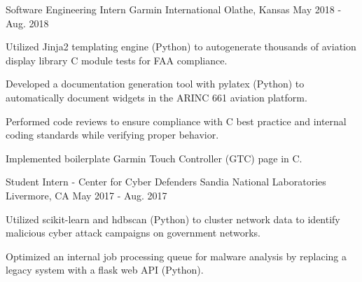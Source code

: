 

\begin{cventries}


\cventry
  {Software Engineering Intern} %
  {Garmin International} %
  {Olathe, Kansas} %
  {May 2018 - Aug. 2018} %
  {
    \begin{cvitems} %
      \item {Utilized Jinja2 templating engine (Python) to autogenerate thousands of aviation display library C module tests for FAA compliance.}
      \item {Developed a documentation generation tool with pylatex (Python) to automatically document widgets in the ARINC 661 aviation platform.}
      \item {Performed code reviews to ensure compliance with C best practice and internal coding standards while verifying proper behavior.}
      \item {Implemented boilerplate Garmin Touch Controller (GTC) page in C.}
    \end{cvitems}
  }


\cventry
  {Student Intern - Center for Cyber Defenders} %
  {Sandia National Laboratories} %
  {Livermore, CA} %
  {May 2017 - Aug. 2017} %
  {
    \begin{cvitems} %
      \item {Utilized scikit-learn and hdbscan (Python) to cluster network data to identify malicious cyber attack campaigns on government networks.}
      \item {Optimized an internal job processing queue for malware analysis by replacing a legacy system with a flask web API (Python).}
    \end{cvitems}
  }



\end{cventries}
